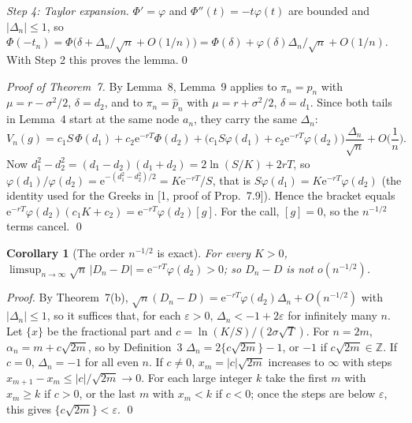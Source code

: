 \documentclass[11pt,a4paper]{article}
\theoremstyle{tight}
\newtheorem{cor}[thm]{Corollary}
\theoremstyle{tightrm}
\newcommand{\e}{\mathrm{e}}
\renewenvironment{proof}[1][Proof]{\par\textit{#1.}\enspace}{\qed\par}
\begin{document}
\emph{Step 4: Taylor expansion.} $\Phi'=\varphi$ and $\Phi''(t)=-t\varphi(t)$ are bounded and $|\Delta_n|\le1$, so $\Phi(-t_n)=\Phi\big(\delta+\Delta_n/\sqrt n+O(1/n)\big)=\Phi(\delta)+\varphi(\delta)\Delta_n/\sqrt n+O(1/n)$. With Step 2 this proves the lemma.\qed

\begin{proof}[Proof of Theorem~7]
By Lemma~8, Lemma~9 applies to $\pi_n=p_n$ with $\mu=r-\sigma^2/2$, $\delta=d_2$, and to $\pi_n=\hat p_n$ with $\mu=r+\sigma^2/2$, $\delta=d_1$. Since both tails in Lemma~4 start at the same node $a_n$, they carry the same $\Delta_n$:
\[
V_n(g)=c_1S\,\Phi(d_1)+c_2\e^{-rT}\Phi(d_2)+\big(c_1S\varphi(d_1)+c_2\e^{-rT}\varphi(d_2)\big)\frac{\Delta_n}{\sqrt n}+O\Big(\frac1n\Big).
\]
Now $d_1^2-d_2^2=(d_1-d_2)(d_1+d_2)=2\ln(S/K)+2rT$, so $\varphi(d_1)/\varphi(d_2)=\e^{-(d_1^2-d_2^2)/2}=K\e^{-rT}/S$, that is
$S\varphi(d_1)=K\e^{-rT}\varphi(d_2)$ (the identity used for the Greeks in [1, proof of Prop.~7.9]). Hence the bracket
equals $\e^{-rT}\varphi(d_2)(c_1K+c_2)=\e^{-rT}\varphi(d_2)[g]$. For the call, $[g]=0$, so the $n^{-1/2}$ terms cancel.
\end{proof}
\begin{cor}[The order $n^{-1/2}$ is exact]
For every $K>0$, $\limsup_{n\to\infty}\sqrt n\,|D_n-D|=\e^{-rT}\varphi(d_2)>0$; so $D_n-D$ is not $o(n^{-1/2})$.
\end{cor}
\begin{proof}
By Theorem~7(b), $\sqrt n(D_n-D)=\e^{-rT}\varphi(d_2)\Delta_n+O(n^{-1/2})$ with $|\Delta_n|\le1$, so it suffices that, for each $\varepsilon>0$, $\Delta_n<-1+2\varepsilon$ for infinitely many $n$. Let $\{x\}$ be the fractional part and $c=\ln(K/S)/(2\sigma\sqrt T)$. For $n=2m$, $\alpha_n=m+c\sqrt{2m}$, so by Definition~3 $\Delta_n=2\{c\sqrt{2m}\}-1$, or $-1$ if $c\sqrt{2m}\in\mathbb Z$. If $c=0$, $\Delta_n=-1$ for all even $n$. If $c\ne0$, $x_m=|c|\sqrt{2m}$ increases to $\infty$ with steps $x_{m+1}-x_m\le|c|/\sqrt{2m}\to0$. For each large integer $k$ take the first $m$ with $x_m\ge k$ if $c>0$, or the last $m$ with $x_m<k$ if $c<0$; once the steps are below $\varepsilon$, this gives $\{c\sqrt{2m}\}<\varepsilon$.
\end{proof}
\end{document}
